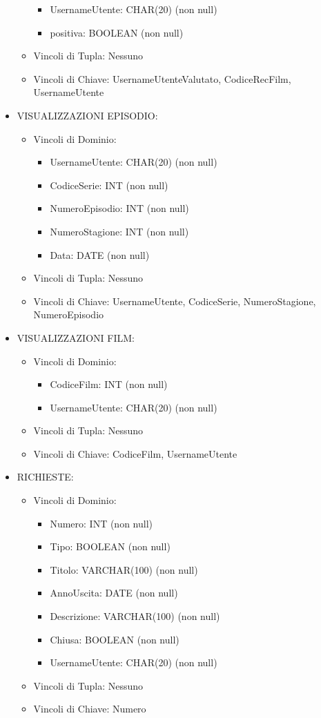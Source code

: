 \documentclass[a4paper,12pt]{report}
\begin{document}
\begin{itemize}
\begin{itemize}
\begin{itemize}
			\item UsernameUtente: CHAR(20) (non null)
			\item positiva: BOOLEAN (non null)
		\end{itemize}
		\item Vincoli di Tupla: Nessuno
		\item Vincoli di Chiave: UsernameUtenteValutato, CodiceRecFilm, UsernameUtente
	\end{itemize}
	\item VISUALIZZAZIONI EPISODIO:
	\begin{itemize}
		\item Vincoli di Dominio:
		\begin{itemize}
			\item UsernameUtente: CHAR(20) (non null)
			\item CodiceSerie: INT (non null)
			\item NumeroEpisodio: INT (non null)
			\item NumeroStagione: INT (non null)
			\item Data: DATE (non null)
		\end{itemize}
		\item Vincoli di Tupla: Nessuno
		\item Vincoli di Chiave: UsernameUtente, CodiceSerie, NumeroStagione, NumeroEpisodio
	\end{itemize}
	\item VISUALIZZAZIONI FILM:
	\begin{itemize}
		\item Vincoli di Dominio:
		\begin{itemize}
			\item CodiceFilm: INT (non null)
			\item UsernameUtente: CHAR(20) (non null)
		\end{itemize}
		\item Vincoli di Tupla: Nessuno
		\item Vincoli di Chiave: CodiceFilm, UsernameUtente
	\end{itemize}
	\item RICHIESTE:
	\begin{itemize}
		\item Vincoli di Dominio:
		\begin{itemize}
			\item Numero: INT (non null)
			\item Tipo: BOOLEAN (non null)
			\item Titolo: VARCHAR(100) (non null)
			\item AnnoUscita: DATE (non null)
			\item Descrizione: VARCHAR(100) (non null)
			\item Chiusa: BOOLEAN (non null)
			\item UsernameUtente: CHAR(20) (non null)
		\end{itemize}
		\item Vincoli di Tupla: Nessuno
		\item Vincoli di Chiave: Numero
	\end{itemize}
\end{itemize}
\end{document}
